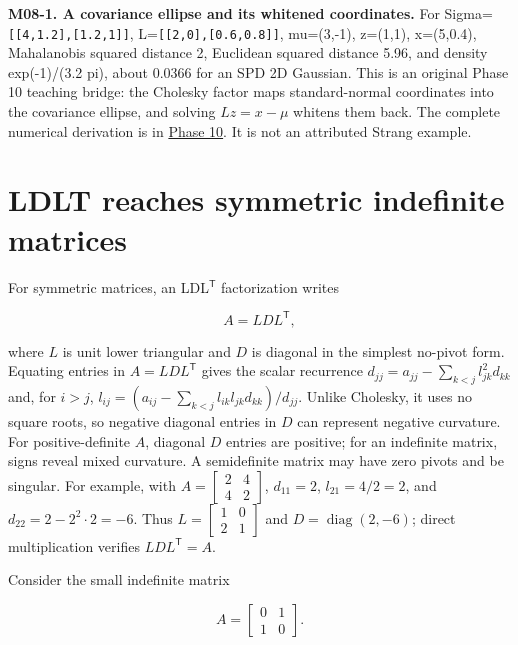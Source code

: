 \textbf{M08-1. A covariance ellipse and its whitened coordinates.} For Sigma=\texttt{{[}{[}4,1.2{]},{[}1.2,1{]}{]}}, L=\texttt{{[}{[}2,0{]},{[}0.6,0.8{]}{]}}, mu=(3,-1), z=(1,1), x=(5,0.4), Mahalanobis squared distance 2, Euclidean squared distance 5.96, and density exp(-1)/(3.2 pi), about 0.0366 for an SPD 2D Gaussian. This is an original Phase 10 teaching bridge: the Cholesky factor maps standard-normal coordinates into the covariance ellipse, and solving \(Lz=x-\mu\) whitens them back. The complete numerical derivation is in \hyperref[02-foundations-ii-ch024-original-bridge-whiten-a-covariance-ellipse]{Phase 10}. It is not an attributed Strang example.

\section{LDLT reaches symmetric indefinite matrices}\label{01-foundations-i-ch020-ldlt-reaches-symmetric-indefinite-matrices}

\hypertarget{01-foundations-i-ch020-ldlt-reaches-symmetric-indefinite-matrices}{}

For symmetric matrices, an LDL\(^\mathsf T\) factorization writes

\[
A=LDL^\mathsf T,
\]

where \(L\) is unit lower triangular and \(D\) is diagonal in the simplest no-pivot form. Equating entries in \(A=LDL^\mathsf T\) gives the scalar recurrence \(d_{jj}=a_{jj}-\sum_{k<j}l_{jk}^2d_{kk}\) and, for \(i>j\), \(l_{ij}=(a_{ij}-\sum_{k<j}l_{ik}l_{jk}d_{kk})/d_{jj}\). Unlike Cholesky, it uses no square roots, so negative diagonal entries in \(D\) can represent negative curvature. For positive-definite \(A\), diagonal \(D\) entries are positive; for an indefinite matrix, signs reveal mixed curvature. A semidefinite matrix may have zero pivots and be singular. For example, with \(A=\begin{bmatrix}2&4\\4&2\end{bmatrix}\), \(d_{11}=2\), \(l_{21}=4/2=2\), and \(d_{22}=2-2^2\cdot2=-6\). Thus \(L=\begin{bmatrix}1&0\\2&1\end{bmatrix}\) and \(D=\operatorname{diag}(2,-6)\); direct multiplication verifies \(LDL^\mathsf T=A\).

Consider the small indefinite matrix

\[
A=\begin{bmatrix}0&1\\1&0\end{bmatrix}.
\]

